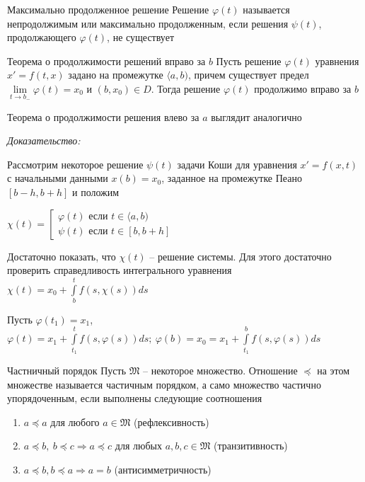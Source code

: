 \documentclass[12pt]{article}
\begin{document}
\begin{defin}{Максимально продолженное решение}
    Решение $\varphi(t)$ называется непродолжимым или максимально продолженным, если решения $\psi(t)$, продолжающего $\varphi(t)$, не существует
\end{defin}

\begin{theo}{Теорема о продолжимости решений вправо за $b$}
    Пусть решение $\varphi(t)$ уравнения $x' = f(t, x)$ задано на промежутке $\langle a, b)$, причем существует предел $\lim\limits_{t \to b_-} \varphi(t) = x_0$ и $(b, x_0) \in D$. Тогда решение $\varphi(t)$ продолжимо вправо за $b$

    Теорема о продолжимости решения влево за $a$ выглядит аналогично
\end{theo}

\textit{Доказательство:}

Рассмотрим некоторое решение $\psi(t)$ задачи Коши для уравнения $x' = f(x, t)$ с начальными данными $x(b) = x_0$, заданное на промежутке Пеано $[b - h, b + h]$ и положим 

$\chi(t) = \left[ \begin{gathered}
    \varphi(t) \text{ если } t \in \langle a, b) \\
    \psi(t) \text{ если } t \in [b, b + h]
\end{gathered} \right.$

Достаточно показать, что $\chi(t)$ -- решение системы. Для этого достаточно проверить справедливость интегрального уравнения $\chi(t) = x_0 + \int\limits_b^t f(s, \chi(s))ds$

Пусть $\varphi(t_1) = x_1$, $\varphi(t) = x_1 + \int\limits_{t_1}^t f(s, \varphi(s))ds;\ \varphi(b) = x_0 = x_1 + \int\limits_{t_1}^b f(s, \varphi(s))ds$

\begin{defin}{Частничный порядок}
    Пусть $\mathfrak{M}$ -- некоторое множество. Отношение $\preccurlyeq$ на этом множестве называется частичным порядком, а само множество частично упорядоченным, если выполнены следующие соотношения

    \begin{enumerate}
        \item $a \preccurlyeq a$ для любого $a \in \mathfrak{M}$ (рефлексивность)
        \item $a \preccurlyeq b,\ b \preccurlyeq c \Rightarrow a \preccurlyeq c$ для любых $a, b, c \in \mathfrak{M}$ (транзитивность)
        \item $a \preccurlyeq b, b \preccurlyeq a \Rightarrow a = b$ (антисимметричность)
    \end{enumerate}
\end{defin}
\end{document}
